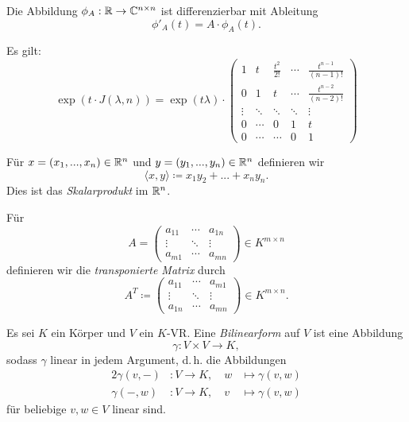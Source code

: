 \documentclass{cheat-sheet}
\begin{document}

\begin{satz}
Die Abbildung $\phi_A : \mathbb{R} \to \mathbb{C}^{n \times n}$ ist differenzierbar mit Ableitung
\[ \phi'_A(t) = A \cdot \phi_A(t). \]
\end{satz}


\begin{satz}
Es gilt:
\[ \exp(t \cdot J(\lambda, n)) = \exp(t \lambda) \cdot \begin{pmatrix}
1 & t & \tfrac{t^2}{2!} & \cdots & \tfrac{t^{n-1}}{(n-1)!} \\
0 & 1 & t & \cdots & \tfrac{t^{n-2}}{(n-2)!} \\
\vdots & \ddots & \ddots & \ddots & \vdots \\
0 & \cdots & 0 & 1 & t \\
0 & \cdots & \cdots & 0 & 1
\end{pmatrix} \]
\end{satz}


\begin{defn}
Für $x = (x_1, ..., x_n) \in \mathbb{R}^n$ und $y = (y_1, ..., y_n) \in \mathbb{R}^n$ definieren wir
\[ \langle x , y \rangle \coloneqq x_1y_2 + ... + x_ny_n. \]
Dies ist das \emph{Skalarprodukt} im $\mathbb{R}^n$.
\end{defn}

\begin{defn}
Für
\[ A = \begin{pmatrix}
a_{11} & \cdots & a_{1n} \\
\vdots & \ddots & \vdots \\
a_{m1} & \cdots & a_{mn}
\end{pmatrix} \in K^{m \times n} \]
definieren wir die \emph{transponierte Matrix} durch
\[ A^{T} \coloneqq \begin{pmatrix}
a_{11} & \cdots & a_{m1} \\
\vdots & \ddots & \vdots \\
a_{1n} & \cdots & a_{mn}
\end{pmatrix} \in K^{m \times n}. \]
\end{defn}

\begin{defn}
Es sei $K$ ein Körper und $V$ ein $K$-VR. Eine \emph{Bilinearform} auf $V$ ist eine Abbildung
\[ \gamma : V \times V \to K, \]
sodass $\gamma$ linear in jedem Argument, d.\,h. die Abbildungen
\begin{alignat*}{2}
\gamma(v, -) &: V \to K, \quad w & \mapsto \gamma(v, w) \\
\gamma(-, w) &: V \to K, \quad v & \mapsto \gamma(v, w)
\end{alignat*}
für beliebige $v, w \in V$ linear sind.
\end{defn}
\end{document}
